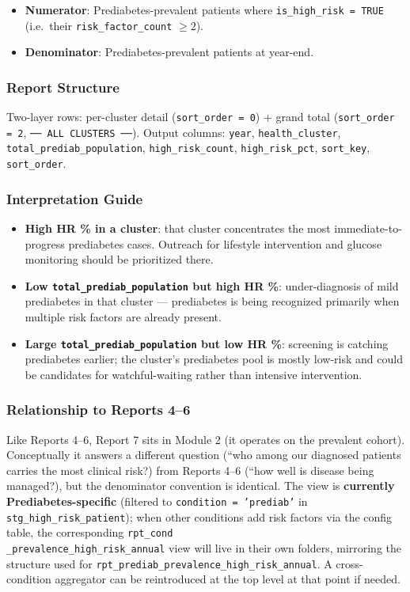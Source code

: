 \documentclass[11pt,a4paper]{article}
\begin{document}
\begin{itemize}[leftmargin=*]
    \item \textbf{Numerator}: Prediabetes-prevalent patients where \texttt{is\_high\_risk = TRUE} (i.e.\ their \texttt{risk\_factor\_count} $\geq 2$).
    \item \textbf{Denominator}: Prediabetes-prevalent patients at year-end.
\end{itemize}

\subsubsection{Report Structure}
Two-layer rows: per-cluster detail (\texttt{sort\_order = 0}) + grand total (\texttt{sort\_order = 2}, \texttt{── ALL CLUSTERS ──}). Output columns: \texttt{year}, \texttt{health\_cluster}, \texttt{total\_prediab\_population}, \texttt{high\_risk\_count}, \texttt{high\_risk\_pct}, \texttt{sort\_key}, \texttt{sort\_order}.

\subsubsection{Interpretation Guide}
\begin{itemize}[leftmargin=*]
    \item \textbf{High HR \% in a cluster}: that cluster concentrates the most immediate-to-progress prediabetes cases. Outreach for lifestyle intervention and glucose monitoring should be prioritized there.
    \item \textbf{Low \texttt{total\_prediab\_population} but high HR \%}: under-diagnosis of mild prediabetes in that cluster --- prediabetes is being recognized primarily when multiple risk factors are already present.
    \item \textbf{Large \texttt{total\_prediab\_population} but low HR \%}: screening is catching prediabetes earlier; the cluster's prediabetes pool is mostly low-risk and could be candidates for watchful-waiting rather than intensive intervention.
\end{itemize}

\subsubsection{Relationship to Reports 4--6}
Like Reports 4--6, Report 7 sits in Module 2 (it operates on the prevalent cohort). Conceptually it answers a different question (``who among our diagnosed patients carries the most clinical risk?) from Reports 4--6 (``how well is disease being managed?), but the denominator convention is identical. The view is \textbf{currently Prediabetes-specific} (filtered to \texttt{condition = 'prediab'} in \texttt{stg\_high\_risk\_patient}); when other conditions add risk factors via the config table, the corresponding \texttt{rpt\_{cond}\\_prevalence\_high\_risk\_annual} view will live in their own folders, mirroring the structure used for \texttt{rpt\_prediab\_prevalence\_high\_risk\_annual}. A cross-condition aggregator can be reintroduced at the top level at that point if needed.
\end{document}
